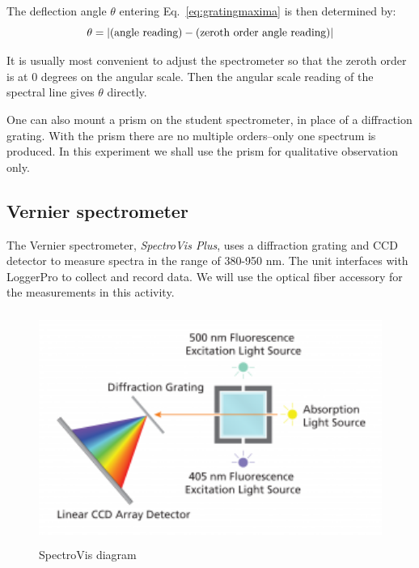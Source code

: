 The deflection angle ${\theta}$ entering Eq.~\ref{eq:gratingmaxima} is then
determined by: 
\begin{equation}
\theta = \left| {\rm(angle\ reading)} - {\rm (zeroth\ order\ angle\ reading)} \right|
\label{eq:calib}
\end{equation}

It is usually most convenient to adjust the spectrometer so that the zeroth
order is at 0 degrees on the angular scale. Then the angular scale reading of
the spectral line gives ${\theta}$ directly.

One can also mount a prism on the student spectrometer, in place of a
diffraction grating. With the prism there are no multiple orders--only one
spectrum is produced. In this experiment we shall use the prism for qualitative
observation only.

\subsection{Vernier spectrometer}

The Vernier spectrometer, \textit{SpectroVis Plus}, uses a diffraction grating
and CCD detector to measure spectra in the range of 380-950 nm.  The unit
interfaces with LoggerPro to collect and record data. We will use the optical
fiber accessory for the measurements in this activity.

\begin{figure}
\begin{centering}
\includegraphics[width=4.4862in,height=2.972in]{../images/SpectroVisDiagram.png} 
\caption{SpectroVis diagram}
\label{fig:spectrovisdiagram}
\end{centering}
\end{figure}


